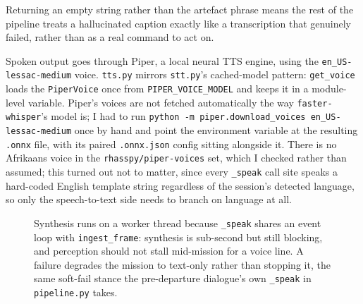 Returning an empty string rather than the artefact phrase means the rest of
the pipeline treats a hallucinated caption exactly like a transcription that
genuinely failed, rather than as a real command to act on.

\label{ssec:tts}

Spoken output goes through Piper, a local neural TTS engine, using the
\texttt{en\_US-lessac-medium} voice. \texttt{tts.py} mirrors \texttt{stt.py}'s
cached-model pattern: \texttt{get\_voice} loads the \texttt{PiperVoice} once
from \texttt{PIPER\_VOICE\_MODEL} and keeps it in a module-level variable.
Piper's voices are not fetched automatically the way \texttt{faster-whisper}'s
model is; I had to run \texttt{python -m piper.\allowbreak download\_voices
en\_US-\allowbreak lessac-medium} once by hand and point the environment
variable at the resulting \texttt{.onnx} file, with its paired
\texttt{.onnx.json} config sitting alongside it. There is no Afrikaans voice
in the \texttt{rhasspy/\allowbreak piper-voices} set, which I checked rather
than assumed; this turned out not to matter, since every \texttt{\_speak}
call site speaks a hard-coded English template string regardless of the
session's detected language, so only the speech-to-text side needs to branch
on language at all.

\begin{figure}[htbp]
  \centering
  \caption{Synthesis runs on a worker thread because \texttt{\_speak} shares an event loop with \texttt{ingest\_frame}: synthesis is sub-second but still blocking, and perception should not stall mid-mission for a voice line. A failure degrades the mission to text-only rather than stopping it, the same soft-fail stance the pre-departure dialogue's own \texttt{\_speak} in \texttt{pipeline.py} takes.}
  \label{fig:flow-tts}
\end{figure}

